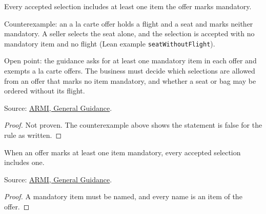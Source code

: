 \begin{theorem}
  \label{thm:order-creation-select-includes-mandatory}
  Every accepted selection includes at least one item the offer marks
  mandatory.

  Counterexample: an a la carte offer holds a flight and a seat and marks
  neither mandatory.  A seller selects the seat alone, and the selection is
  accepted with no mandatory item and no flight (Lean example
  \texttt{seatWithoutFlight}).

  Open point: the guidance asks for at least one mandatory item in each offer
  and exempts a la carte offers.  The business must decide which selections
  are allowed from an offer that marks no item mandatory, and whether a seat
  or bag may be ordered without its flight.

  Source: \href{https://standards.atlassian.net/wiki/spaces/ARMI/pages/584318980/General+Guidance}{ARMI, General Guidance}.
\end{theorem}
\begin{proof}
  Not proven.  The counterexample above shows the statement is false for the
  rule as written.
\end{proof}

\begin{theorem}
  \label{thm:order-creation-select-mandatory-of-marked}
  When an offer marks at least one item mandatory, every accepted selection
  includes one.

  Source: \href{https://standards.atlassian.net/wiki/spaces/ARMI/pages/584318980/General+Guidance}{ARMI, General Guidance}.
\end{theorem}
\begin{proof}
  A mandatory item must be named, and every name is an item of the offer.
\end{proof}


